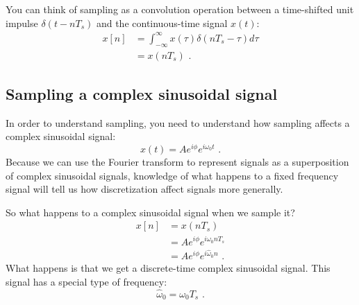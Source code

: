  You can think of sampling as a convolution operation between a
time-shifted unit impulse $\delta(t-nT_s)$ and the continuous-time
signal $x(t)$:
\begin{align}
  x[n] & = \int_{-\infty}^{\infty} x(\tau) \delta(n T_s - \tau)  d\tau \\
       & = x(n T_s)\,\,.
\end{align}
\fi

\subsection{Sampling a complex sinusoidal signal}
In order to understand sampling, you need to understand how sampling affects a complex sinusoidal signal:
\begin{equation}
    x(t)=A e^{i\phi} e^{i\omega_0 t}\,\,.
\end{equation}
Because we can use the Fourier transform to represent signals as a superposition of complex sinusoidal signals, knowledge of what happens to a fixed frequency signal will tell us how discretization affect signals more generally.

\begin{marginfigure}
\begin{center}
\end{center}
\end{marginfigure}

So what happens to a complex sinusoidal signal when we sample it? 
\begin{align}
x[n]&=x(nT_s)\\
    &=A e^{i\phi} e^{i\omega_0 n T_s }\\
    &=A e^{i\phi} e^{i\hat{\omega}_0 n}\,\,.
\end{align}
What happens is that we get a discrete-time complex sinusoidal signal. This signal has a special type of frequency:
\begin{equation}
  \boxed{
    \hat{\omega}_0 = \omega_0 T_s
    }\,\,.
\end{equation}

